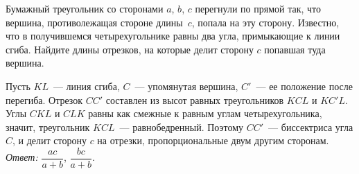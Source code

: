 \problem
{}
Бумажный треугольник со сторонами $a$, $b$, $c$ перегнули по прямой так,
что вершина, противолежащая стороне длины~$c$, попала на эту сторону.
Известно, что в получившемся четырехугольнике равны два угла,
примыкающие к линии сгиба.
Найдите длины отрезков, на которые делит сторону $c$ попавшая туда вершина.

\solution
Пусть $KL$~--- линия сгиба, $C$~--- упомянутая вершина, $C'$~--- ее
положение после перегиба.
Отрезок $CC'$ составлен из высот равных треугольников $KCL$ и $KC'L$.
Углы $CKL$ и $CLK$ равны как смежные к равным углам четырехугольника, значит,
треугольник $KCL$~--- равнобедренный.
Поэтому $CC'$~--- биссектриса угла $C$, и делит сторону $c$ на отрезки,
пропорциональные двум другим сторонам.
\emph{Ответ:} $\dfrac{a c}{a + b}$, $\dfrac{b c}{a + b}$.

\endproblem
